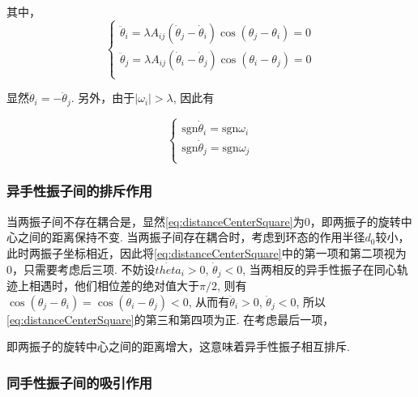 \documentclass{article}
\begin{document}
其中，
$$
\begin{cases}
	\ddot{\theta}_i=\lambda A_{ij}\left( \dot{\theta}_j-\dot{\theta}_i \right) \cos \left( \theta _j-\theta _i \right) =0\\
	\ddot{\theta}_j=\lambda A_{ij}\left( \dot{\theta}_i-\dot{\theta}_j \right) \cos \left( \theta _i-\theta _j \right) =0\\
\end{cases}
$$


显然$\ddot{\theta}_i=-\ddot{\theta}_j$. 另外，由于$\left|\omega_i\right|> \lambda$, 因此有

$$
\begin{cases}
	\text{sgn} \dot{\theta}_i=\text{sgn} \omega _i\\
	\text{sgn} \dot{\theta}_j=\text{sgn} \omega _j\\
\end{cases}
$$

\subsubsection{异手性振子间的排斥作用}

当两振子间不存在耦合是，显然\ref{eq:distanceCenterSquare}为0，即两振子的旋转中心之间的距离保持不变. 当两振子间存在耦合时，考虑到环态的作用半径$d_0$较小，此时两振子坐标相近，因此将\ref{eq:distanceCenterSquare}中的第一项和第二项视为0，只需要考虑后三项. 不妨设$\dot{theta}_i>0$, $\dot{\theta}_j<0$, 当两相反的异手性振子在同心轨迹上相遇时，他们相位差的绝对值大于$\pi/2$, 则有$\cos(\theta_j-\theta_i)=\cos(\theta_i-\theta_j)<0$, 从而有$\ddot{\theta}_i>0$, $\ddot{\theta}_j<0$, 所以\ref{eq:distanceCenterSquare}的第三和第四项为正. 在考虑最后一项，

即两振子的旋转中心之间的距离增大，这意味着异手性振子相互排斥.

\subsubsection{同手性振子间的吸引作用}
\end{document}
